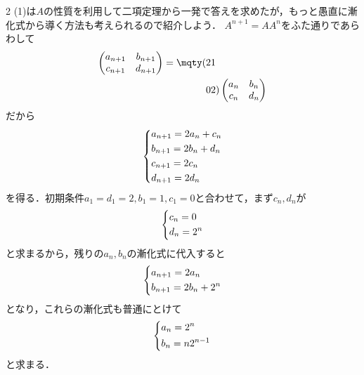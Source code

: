 \documentclass[../../main.tex]{subfiles}
\begin{document}
\begin{multicols}{2}
  (1)は$A$の性質を利用して二項定理から一発で答えを求めたが，もっと愚直に漸化式から導く方法も考えられるので紹介しよう．
  $A^{n+1}=A A^{n}$をふた通りであらわして
  \begin{align*}
    \begin{pmatrix} a_{n+1} & b_{n+1} \\ c_{n+1} & d_{n+1} \end{pmatrix} = \mqty(2 & 1 \\ 0 & 2) \begin{pmatrix} a_n & b_n \\ c_n & d_n \end{pmatrix}
  \end{align*}
  だから
  \begin{align*}
    \begin{dcases}
      a_{n+1} = 2 a_{n} + c_{n} \\
      b_{n+1} = 2 b_{n} + d_{n} \\
      c_{n+1} = 2c_{n}          \\
      d_{n+1} = 2d_{n}
    \end{dcases}
  \end{align*}
  を得る．初期条件$a_1=d_1=2,b_1=1,c_1=0$と合わせて，まず$c_n,d_n$が
  \begin{align*}
    \begin{dcases}
      c_{n} = 0 \\
      d_{n} = 2^{n}
    \end{dcases}
  \end{align*}
  と求まるから，残りの$a_n,b_n$の漸化式に代入すると
  \begin{align*}
    \begin{dcases}
      a_{n+1} = 2 a_{n} \\
      b_{n+1} = 2 b_{n} + 2^{n}
    \end{dcases}
  \end{align*}
  となり，これらの漸化式も普通にとけて
  \begin{align*}
    \begin{dcases}
      a_n = 2^{n} \\
      b_n = n2^{n-1}
    \end{dcases}
  \end{align*}
  と求まる．


\end{multicols}
\end{document}
